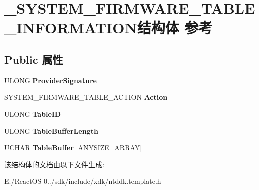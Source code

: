 \hypertarget{struct___s_y_s_t_e_m___f_i_r_m_w_a_r_e___t_a_b_l_e___i_n_f_o_r_m_a_t_i_o_n}{}\section{\+\_\+\+S\+Y\+S\+T\+E\+M\+\_\+\+F\+I\+R\+M\+W\+A\+R\+E\+\_\+\+T\+A\+B\+L\+E\+\_\+\+I\+N\+F\+O\+R\+M\+A\+T\+I\+O\+N结构体 参考}
\label{struct___s_y_s_t_e_m___f_i_r_m_w_a_r_e___t_a_b_l_e___i_n_f_o_r_m_a_t_i_o_n}
\subsection*{Public 属性}
\begin{DoxyCompactItemize}
\item 
\mbox{\label{struct___s_y_s_t_e_m___f_i_r_m_w_a_r_e___t_a_b_l_e___i_n_f_o_r_m_a_t_i_o_n_a72eaa58d37d8f3f7038579ec85a6a74c}} 
U\+L\+O\+NG {\bfseries Provider\+Signature}
\item 
\mbox{\label{struct___s_y_s_t_e_m___f_i_r_m_w_a_r_e___t_a_b_l_e___i_n_f_o_r_m_a_t_i_o_n_a196edd51075da1397cce934bb7a692c4}} 
S\+Y\+S\+T\+E\+M\+\_\+\+F\+I\+R\+M\+W\+A\+R\+E\+\_\+\+T\+A\+B\+L\+E\+\_\+\+A\+C\+T\+I\+ON {\bfseries Action}
\item 
\mbox{\label{struct___s_y_s_t_e_m___f_i_r_m_w_a_r_e___t_a_b_l_e___i_n_f_o_r_m_a_t_i_o_n_acdc9911067aa0fb134f9d11202cb4640}} 
U\+L\+O\+NG {\bfseries Table\+ID}
\item 
\mbox{\label{struct___s_y_s_t_e_m___f_i_r_m_w_a_r_e___t_a_b_l_e___i_n_f_o_r_m_a_t_i_o_n_a80d0299b2de7417c077bea9a4f398ce3}} 
U\+L\+O\+NG {\bfseries Table\+Buffer\+Length}
\item 
\mbox{\label{struct___s_y_s_t_e_m___f_i_r_m_w_a_r_e___t_a_b_l_e___i_n_f_o_r_m_a_t_i_o_n_a3cc502361f4c9c0421488fe1dadf101b}} 
U\+C\+H\+AR {\bfseries Table\+Buffer} \mbox{[}A\+N\+Y\+S\+I\+Z\+E\+\_\+\+A\+R\+R\+AY\mbox{]}
\end{DoxyCompactItemize}


该结构体的文档由以下文件生成\+:\begin{DoxyCompactItemize}
\item 
E\+:/\+React\+O\+S-\/0../sdk/include/xdk/ntddk.\+template.\+h\end{DoxyCompactItemize}
